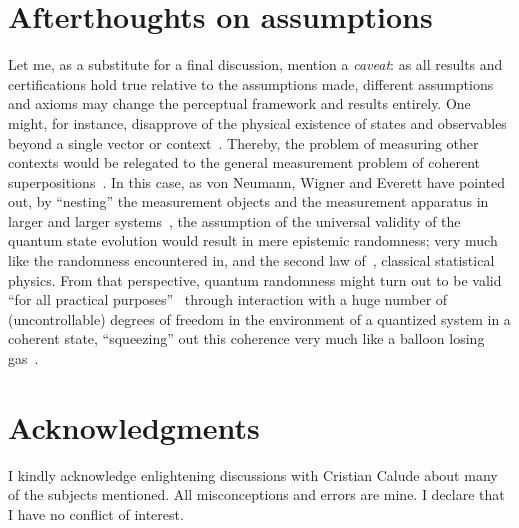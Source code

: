 \documentclass[runningheads]{llncs}
\begin{document}
\section{Afterthoughts on assumptions}

Let me, as a substitute for a final discussion, mention a {\it caveat}: as all results and certifications hold true relative to the assumptions made,
different assumptions and axioms may change the perceptual framework and results entirely.
One might, for instance, disapprove of the physical existence of states and observables beyond a single vector or context~\cite{svozil-2018-whycontexts,Auffeves-Grangier-2018}.
Thereby, the problem of measuring other contexts would be relegated to the general measurement problem of coherent superpositions~\cite{london-Bauer-1983}.
In this case, as von Neumann, Wigner and Everett have pointed out, by ``nesting'' the measurement objects and the measurement apparatus in larger and larger systems~\cite{everett-collw},
the assumption of the universal validity of the quantum state evolution would
result in mere epistemic randomness; very much like the randomness encountered in, and the second law of~\cite{Myrvold2011237}, classical statistical physics.
From that perspective, quantum randomness might turn out to be valid ``for all practical purposes''~\cite{bell-a} through interaction with a huge number of (uncontrollable) degrees of freedom
in the environment of a quantized system in a coherent state, ``squeezing'' out this coherence very much like a balloon losing gas~\cite{Zyczkowski-balloon}.

\section*{Acknowledgments}
I kindly acknowledge enlightening discussions with Cristian Calude about many of the subjects mentioned.
All misconceptions and errors are mine.
I declare that I have no conflict of interest.


%
%
%
% 
% 
%
\end{document}

